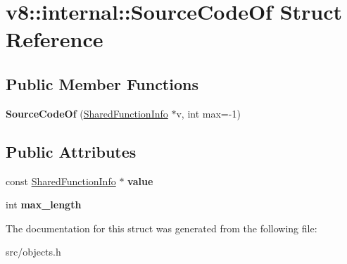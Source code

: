 \hypertarget{structv8_1_1internal_1_1_source_code_of}{}\section{v8\+:\+:internal\+:\+:Source\+Code\+Of Struct Reference}
\label{structv8_1_1internal_1_1_source_code_of}
\subsection*{Public Member Functions}
\begin{DoxyCompactItemize}
\item 
\hypertarget{structv8_1_1internal_1_1_source_code_of_a353fda7f55d77a8cb35e6774c65ac151}{}{\bfseries Source\+Code\+Of} (\hyperlink{classv8_1_1internal_1_1_shared_function_info}{Shared\+Function\+Info} $\ast$v, int max=-\/1)\label{structv8_1_1internal_1_1_source_code_of_a353fda7f55d77a8cb35e6774c65ac151}

\end{DoxyCompactItemize}
\subsection*{Public Attributes}
\begin{DoxyCompactItemize}
\item 
\hypertarget{structv8_1_1internal_1_1_source_code_of_ac60e3e84fe5b71bc3a19dcf0cb7fbbe8}{}const \hyperlink{classv8_1_1internal_1_1_shared_function_info}{Shared\+Function\+Info} $\ast$ {\bfseries value}\label{structv8_1_1internal_1_1_source_code_of_ac60e3e84fe5b71bc3a19dcf0cb7fbbe8}

\item 
\hypertarget{structv8_1_1internal_1_1_source_code_of_abbb1e68e0622cae35e67653d7ede0560}{}int {\bfseries max\+\_\+length}\label{structv8_1_1internal_1_1_source_code_of_abbb1e68e0622cae35e67653d7ede0560}

\end{DoxyCompactItemize}


The documentation for this struct was generated from the following file\+:\begin{DoxyCompactItemize}
\item 
src/objects.\+h\end{DoxyCompactItemize}
